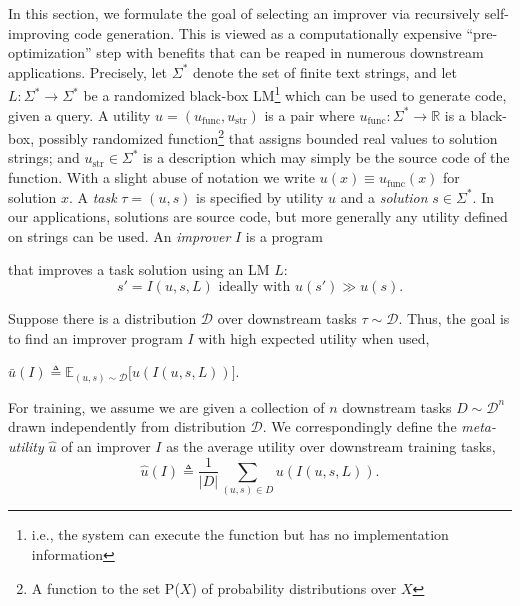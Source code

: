 \documentclass{article}
\newcommand{\E}{\mathbb{E}}
\newcommand{\metautil}{{\hat{u}}}
\newcommand{\exputil}{{\bar{u}}}
\newcommand{\sol}{{s}}
\newcommand{\D}{{\mathcal{D}}}
\newcommand{\defeq}{\triangleq}
\begin{document}
In this section, we formulate the goal of selecting an improver via recursively self-improving code generation. This is viewed as a computationally expensive ``pre-optimization'' step with benefits that can be reaped in numerous downstream applications. Precisely, let $\Sigma^*$ denote the set of finite text strings, and let $L: \Sigma^* \rightarrow \Sigma^*$ be a randomized black-box LM\footnote{i.e., the system can execute the function but has no implementation information} which can be used to generate code, given a query. A utility $u=(u_\text{func}, u_\text{str})$ is a pair where $u_\text{func}:\Sigma^* \rightarrow \mathbb{R}$ is a black-box, possibly randomized function\footnote{A function to the set P($X$) of probability distributions over $X$} that assigns bounded real values to solution strings; and $u_\text{str} \in \Sigma^*$ is a description  which may simply be the source code of the function. With a slight abuse of notation we write $u(x) \equiv u_\text{func}(x)$ for solution $x$. A \emph{task} $\tau = (u,\sol)$  is specified by utility $u$ and a \emph{solution} $\sol\in \Sigma^*$. In our applications, solutions are source code, but more generally any utility defined on strings can be used. An \emph{improver} $I$ is a program

that improves a task solution using an LM $L$:
\begin{equation}

    \sol' = I(u, \sol, L) \text{ ideally with }
u(\sol') \gg u(\sol).

\end{equation}


\vspace{-15px}

Suppose there is a distribution $\D$ over downstream tasks $\tau\sim \D$. Thus, the goal is to find an improver program $I$ with high expected utility when used,

$

    \exputil(I) \defeq \E_{(u, \sol) \sim \D} \bigl[u(I(u, \sol, L))\bigr].

$


For training, we assume we are given a collection of $n$ downstream tasks $D\sim \D^n$ drawn independently from distribution $\D$. We correspondingly define the \textit{meta-utility} $\metautil$ of an improver $I$ as the average utility over downstream training tasks, 
\begin{equation}
    \metautil(I)\defeq\frac{1}{|D|}\sum_{(u,\sol)\in D}u(I(u, \sol, L)).
\end{equation}
\vspace{-12px}
\end{document}
